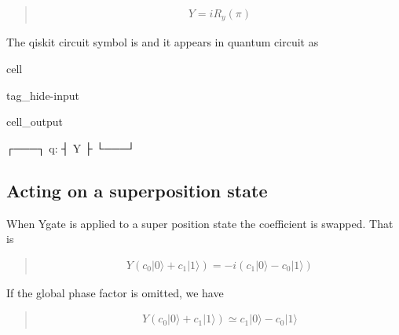 \documentclass[letterpaper,10pt,english]{jupyterBook}
\begin{document}
\sphinxAtStartPar
{}
\begin{quote}
\begin{equation*}
\begin{split}
Y = i R_y(\pi)
\end{split}
\end{equation*}\end{quote}

\sphinxAtStartPar
The qiskit circuit symbol is  and it appears in quantum circuit as

\begin{sphinxuseclass}{cell}
\begin{sphinxuseclass}{tag_hide-input}\begin{sphinxVerbatimOutput}

\begin{sphinxuseclass}{cell_output}
\begin{sphinxVerbatim}[commandchars=\\\{\}]
   ┌───┐
q: ┤ Y ├
   └───┘
\end{sphinxVerbatim}

\end{sphinxuseclass}\end{sphinxVerbatimOutput}

\end{sphinxuseclass}
\end{sphinxuseclass}

\subsection{Acting on a superposition state}
\label{\detokenize{q1gates/y:acting-on-a-superposition-state}}
\sphinxAtStartPar
When Ygate is applied to a super position state the coefficient is swapped.  That is
\begin{quote}
\begin{equation}\label{equation:q1gates/y:Y-on-superpos}
\begin{split}
Y \left (c_0 |0\rangle + c_1 |1\rangle\right)  = -i (c_1 |0\rangle - c_0 |1\rangle)
\end{split}
\end{equation}\end{quote}

\sphinxAtStartPar
If the global phase factor is omitted, we have
\begin{quote}
\begin{equation}\label{equation:q1gates/y:Y-on-superpos2}
\begin{split}
Y \left (c_0 |0\rangle + c_1 |1\rangle\right) \simeq c_1 |0\rangle - c_0 |1\rangle
\end{split}
\end{equation}\end{quote}
\end{document}
